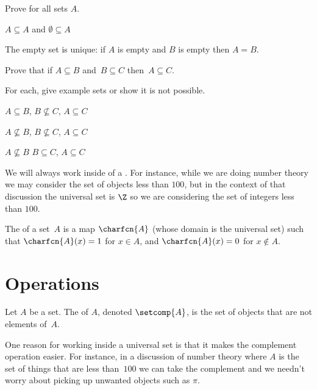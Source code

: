 \documentclass{ibl}
\begin{document}
\begin{ex} Prove for all sets $A$.
\begin{exes}
\item $A\subseteq A$ and $\emptyset\subseteq A$
\item The empty set is unique: if $A$ is empty and $B$ is empty then $A=B$.
\end{exes}
\end{ex}

\begin{ex}
Prove that if $A\subseteq B$ and~$B\subseteq C$ then~$A\subseteq C$.  
\end{ex}

\begin{ex} For each, give example sets or show it is not possible.
\begin{exes}
\item $A\subseteq B$, $B\not\subseteq C$, $A\subseteq C$
\item $A\not\subseteq B$, $B\not\subseteq C$, $A\subseteq C$
\item $A\not\subseteq B$ $B\subseteq C$, $A\subseteq C$    
\end{exes}
\end{ex}

We will always work inside of a .
For instance, while we are doing number theory we may consider 
the set of objects less than $100$,
but in the context of that discussion the universal set is $\Z$ 
so we are considering the set of integers less than $100$.

\begin{df}
The  of a set~$A$ is a map
$\charfcn{A}$ (whose domain is the universal set) such that
$\charfcn{A}(x)=1$ for $x\in A$, and $\charfcn{A}(x)=0$ for $x\notin A$.  
\end{df}






\section{Operations}

\begin{df}
Let $A$ be a set.
The  of $A$, denoted $\setcomp{A}$, is the 
set of objects that are not elements of~$A$.  
\end{df}

One reason for working inside a universal set is that it makes the complement
operation easier. 
For instance, in a discussion of number theory where $A$ is the set of 
things that are less than~$100$ we can take the complement and we needn't 
worry about picking up unwanted objects such as $\pi$.
\end{document}
